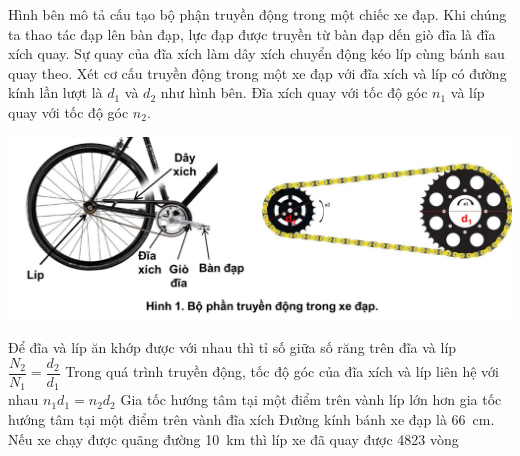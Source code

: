 \begin{ex}
	Hình bên mô tả cấu tạo bộ phận truyền động trong một chiếc xe đạp. Khi chúng ta thao tác đạp lên bàn đạp, lực đạp được truyền từ bàn đạp dến giò đĩa là đĩa xích quay. Sự quay của đĩa xích làm dây xích chuyển động kéo líp cùng bánh sau quay theo.  Xét cơ cấu truyền động trong một xe đạp với đĩa xích và líp có đường kính lần lượt là $d_1$ và $d_2$ như hình bên. Đĩa xích quay với tốc độ góc $n_1$ và líp quay với tốc độ góc $n_2$.
	\begin{center}
		\includegraphics[scale=0.5]{../figs/D10-CK2-002-3}
	\end{center}
	\choiceTF
	{\True Để đĩa và líp ăn khớp được với nhau thì tỉ số giữa số răng trên đĩa và líp $\dfrac{N_2}{N_1}=\dfrac{d_2}{d_1}$}
	{\True Trong quá trình truyền động, tốc độ góc của đĩa xích và líp liên hệ với nhau $n_1d_1=n_2d_2$}
	{\True Gia tốc hướng tâm tại một điểm trên vành líp lớn hơn gia tốc hướng tâm tại một điểm trên vành đĩa xích}
	{\True Đường kính bánh xe đạp là \SI{66}{\centi\meter}. Nếu xe chạy được quãng đường \SI{10}{\kilo\meter} thì líp xe đã quay được 4823 vòng}
	\loigiai{}
\end{ex}
